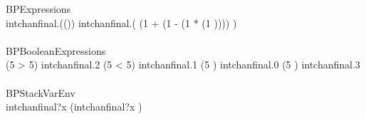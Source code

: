 \begin{circus}
 \circprocess BPExpressions \circdef \circbegin \\
    \circspot intchanfinal.(\negate ()) \then 
      intchanfinal.(
      (1 + (1 - (1 * (1 )))) 
      ) 
      \then \Skip \\
 \circend \\

 \circprocess BPBooleanExpressions \circdef \circbegin \\
    \circspot \circif (5 > 5) \circthen intchanfinal.2 \then \Skip \circelse (5 < 5) \circthen intchanfinal.1 \then \Skip \circelse (5 ) \circthen intchanfinal.0 \then \Skip \circelse (5 ) \circthen intchanfinal.3 \then \Skip \circfi \\
 \circend \\

 \circprocess BPStackVarEnv \circdef \circbegin \\
    \circspot intchanfinal?x \then (intchanfinal?x \then \Skip) \\
 \circend \\

 
 

 

\end{circus}
